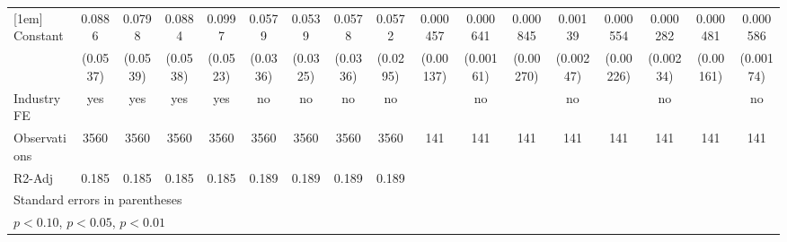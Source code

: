 \begin{table}[htbp]
\begin{tabular}{l*{16}{c}}
[1em]
Constant            &      0.0886         &      0.0798         &      0.0884         &      0.0997\sym{*}  &      0.0579\sym{*}  &      0.0539         &      0.0578\sym{*}  &      0.0572\sym{*}  &    0.000457         &    0.000641         &    0.000845         &     0.00139         &    0.000554         &    0.000282         &    0.000481         &    0.000586         \\
                    &    (0.0537)         &    (0.0539)         &    (0.0538)         &    (0.0523)         &    (0.0336)         &    (0.0325)         &    (0.0336)         &    (0.0295)         &   (0.00137)         &   (0.00161)         &   (0.00270)         &   (0.00247)         &   (0.00226)         &   (0.00234)         &   (0.00161)         &   (0.00174)         \\
\hline
Industry FE         &         yes         &         yes         &         yes         &         yes         &          no         &          no         &          no         &          no         &                     &          no         &                     &          no         &                     &          no         &                     &          no         \\
Observations        &        3560         &        3560         &        3560         &        3560         &        3560         &        3560         &        3560         &        3560         &         141         &         141         &         141         &         141         &         141         &         141         &         141         &         141         \\
R2-Adj              &       0.185         &       0.185         &       0.185         &       0.185         &       0.189         &       0.189         &       0.189         &       0.189         &                     &                     &                     &                     &                     &                     &                     &                     \\
\hline\hline
\multicolumn{17}{l}{\footnotesize Standard errors in parentheses}\\
\multicolumn{17}{l}{\footnotesize \sym{*} \(p<0.10\), \sym{**} \(p<0.05\), \sym{***} \(p<0.01\)}\\
\end{tabular}
\end{table}
